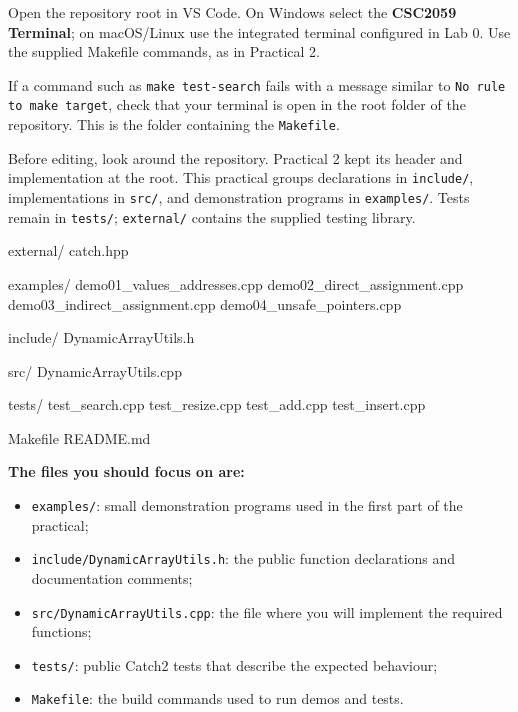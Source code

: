 \documentclass{csc2059practical}
\begin{document}
\begin{importantnote}
Open the repository root in VS Code. On Windows select the \textbf{CSC2059 Terminal}; on macOS/Linux use the integrated terminal configured in Lab 0. Use the supplied Makefile commands, as in Practical 2.
\end{importantnote}

\begin{commonerror}
If a command such as \texttt{make test-search} fails with a message similar to \texttt{No rule to make target}, check that your terminal is open in the root folder of the repository. This is the folder containing the \texttt{Makefile}.
\end{commonerror}


Before editing, look around the repository. Practical 2 kept its header and implementation at the root. This practical groups declarations in \texttt{include/}, implementations in \texttt{src/}, and demonstration programs in \texttt{examples/}. Tests remain in \texttt{tests/}; \texttt{external/} contains the supplied testing library.

\begin{terminal}
external/
    catch.hpp

examples/
    demo01_values_addresses.cpp
    demo02_direct_assignment.cpp
    demo03_indirect_assignment.cpp
    demo04_unsafe_pointers.cpp

include/
    DynamicArrayUtils.h

src/
    DynamicArrayUtils.cpp

tests/
    test_search.cpp
    test_resize.cpp
    test_add.cpp
    test_insert.cpp

Makefile
README.md
\end{terminal}

\begin{infobox}
\textbf{The files you should focus on are:}
\begin{itemize}
  \item \texttt{examples/}: small demonstration programs used in the first part of the practical;
  \item \texttt{include/DynamicArrayUtils.h}: the public function declarations and documentation comments;
  \item \texttt{src/DynamicArrayUtils.cpp}: the file where you will implement the required functions;
  \item \texttt{tests/}: public Catch2 tests that describe the expected behaviour;
  \item \texttt{Makefile}: the build commands used to run demos and tests.
\end{itemize}
\end{infobox}
\end{document}
